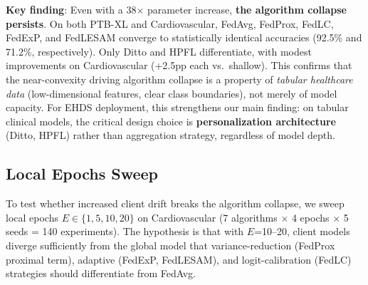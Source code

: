 \documentclass[conference]{IEEEtran}
\begin{document}
\textbf{Key finding}: Even with a 38$\times$ parameter increase, \textbf{the algorithm collapse persists}. On both PTB-XL and Cardiovascular, FedAvg, FedProx, FedLC, FedExP, and FedLESAM converge to statistically identical accuracies (92.5\% and 71.2\%, respectively). Only Ditto and HPFL differentiate, with modest improvements on Cardiovascular (+2.5pp each vs.\ shallow). This confirms that the near-convexity driving algorithm collapse is a property of \textit{tabular healthcare data} (low-dimensional features, clear class boundaries), not merely of model capacity. For EHDS deployment, this strengthens our main finding: on tabular clinical models, the critical design choice is \textbf{personalization architecture} (Ditto, HPFL) rather than aggregation strategy, regardless of model depth.

\subsection{Local Epochs Sweep}
\label{sec:epochs_sweep}

To test whether increased client drift breaks the algorithm collapse, we sweep local epochs $E \in \{1, 5, 10, 20\}$ on Cardiovascular (7 algorithms $\times$ 4 epochs $\times$ 5 seeds = 140 experiments). The hypothesis is that with $E$=10--20, client models diverge sufficiently from the global model that variance-reduction (FedProx proximal term), adaptive (FedExP, FedLESAM), and logit-calibration (FedLC) strategies should differentiate from FedAvg.
\end{document}
